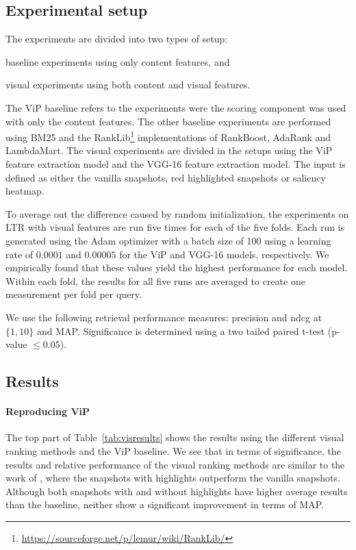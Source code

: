 \subsection{Experimental setup}
The experiments are divided into two types of setup:
\begin{inparaenum}[(i)]
\item baseline experiments using only content features, and
\item visual experiments using both content and visual features.
\end{inparaenum}

The ViP baseline refers to the experiments were the scoring component was used with only the content features. The other baseline experiments are performed using BM25 and the RankLib\footnote{\url{https://sourceforge.net/p/lemur/wiki/RankLib/}} implementations of RankBoost, AdaRank and LambdaMart.
The visual experiments are divided in the setups using the ViP feature extraction model and the VGG-16 feature extraction model. The input is defined as either the vanilla snapshots, red highlighted snapshots or saliency heatmap. 

To average out the difference caused by random initialization, the experiments on \ac{LTR} with visual features are run five times for each of the five folds. 
Each run is generated using the Adam optimizer with a batch size of 100 using a learning rate of $0.0001$ and $0.00005$ for the ViP and VGG-16 models, respectively. We empirically found that these values yield the highest performance for each model.
Within each fold, the results for all five runs are averaged to create one measurement per fold per query.

We use the following retrieval performance measures: precision and ndcg at $\{1,10\}$ and MAP.
Significance is determined using a two tailed paired t-test (p-value $\leq 0.05$). 

\subsection{Results}

\paragraph{Reproducing ViP}
The top part of Table~\ref{tab:visresults} shows the results using the different visual ranking methods and the ViP baseline. 
We see that in terms of significance, the results and relative performance of the visual ranking methods are similar to the work of \citet{fan2017learning}, where the snapshots with highlights outperform the vanilla snapshots. Although both snapshots with and without highlights have higher average results than the baseline, neither show a significant improvement in terms of MAP.



